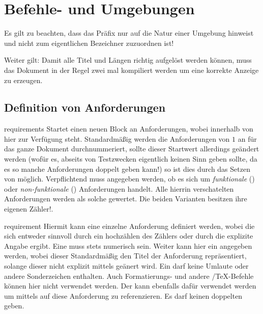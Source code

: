 \documentclass{sopra-base}
\begin{document}
\section{Befehle- und Umgebungen}

Es gilt zu beachten, dass das Präfix  nur auf die Natur einer Umgebung hinweist und nicht zum eigentlichen Bezeichner zuzuordnen ist!\par{}
Weiter gilt: Damit alle Titel und Längen richtig aufgelöst werden können, muss das Dokument
in der Regel zwei mal kompiliert werden um eine korrekte Anzeige zu erzeugen.

\subsection{Definition von Anforderungen}

\begin{environment}{requirements}{}
    Startet einen neuen Block an Anforderungen, wobei innerhalb von hier  zur Verfügung steht. Standardmäßig werden die Anforderungen
    von $1$ an für das ganze Dokument durchnummeriert, sollte dieser Startwert allerdings geändert werden (wofür es, abseits von Testzwecken eigentlich keinen Sinn geben sollte,
    da es so manche Anforderungen doppelt geben kann!) so ist dies durch das Setzen
    von  möglich. Verpflichtend muss angegeben werden, ob es sich
    um \emph{funktionale} () oder \emph{non-funktionale} ()
    Anforderungen handelt. Alle hierrin verschatelten Anforderungen werden als solche
    gewertet. Die beiden Varianten besitzen ihre eigenen Zähler!. 
\end{environment}

\begin{environment}{requirement}{}
     Hiermit kann eine einzelne Anforderung definiert werden, wobei die  sich
    entweder sinnvoll durch ein hochzählen des Zählers oder durch die explizite Angabe ergibt. Eine  muss stets numerisch sein. Weiter kann hier ein  angegeben werden, wobei dieser Standardmäßig den Titel der Anforderung repräsentiert,
    solange dieser nicht explizit mittels  geänert wird. Ein  darf keine Umlaute oder andere Sonderzeichen enthalten. Auch Formatierungs- und andere
    \LaTeXe/\TeX-Befehle können hier nicht verwendet werden. Der  kann ebenfalls dafür verwendet werden um mittels  auf diese Anforderung
    zu referenzieren. Es darf keinen doppelten  geben. 
\end{environment}
\end{document}
